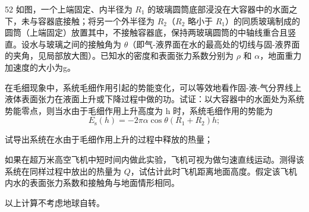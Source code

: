 \begin{problem}[第32届全国中学生物理竞赛决赛]{52}
如图，一个上端固定、内半径为 $R_{1}$ 的玻璃圆筒底部浸没在大容器中的水面之下，未与容器底接触；将另一个外半径为 $R_{2}$（$R_{2}$ 略小于 $R_{1}$）的同质玻璃制成的圆筒（上端固定）放置其中，不接触容器底，保持两玻璃圆筒的中轴线重合且竖直。设水与玻璃之间的接触角为 $\theta$（即气-液界面在水的最高处的切线与固-液界面的夹角，见局部放大图）。已知水的密度和表面张力系数分别为 $\rho$ 和 $\alpha$，地面重力加速度的大小为g。
\begin{subproblem}
在毛细现象中，系统毛细作用引起的势能变化，可以等效地看作固-液-气分界线上液体表面张力在液面上升或下降过程中做的功。试证：以大容器中的水面处为系统势能零点，则当水由于毛细作用上升高度为 h 时，系统毛细作用的势能为
\begin{equation}
E_{\mathrm{s}}(h) = -2\pi\alpha\cos\theta\left(R_{1}+R_{2}\right)h;
\end{equation}
\end{subproblem}
\begin{subproblem}
试导出系统在水由于毛细作用上升的过程中释放的热量；
\end{subproblem}
\begin{subproblem}
如果在超万米高空飞机中短时间内做此实验，飞机可视为做匀速直线运动。测得该系统在同样过程中放出的热量为 $Q$，试估计此时飞机距离地面高度。假定该飞机内水的表面张力系数和接触角与地面情形相同。

以上计算不考虑地球自转。
\end{subproblem}
\end{problem}
